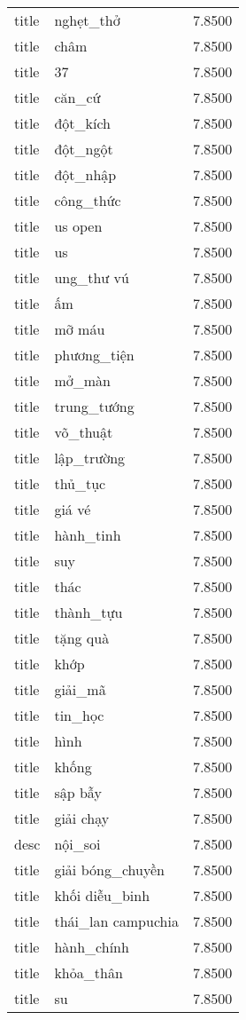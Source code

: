 \documentclass{article}
\begin{document}
\begin{tabular}{lll}
title & nghẹt\_thở & 7.8500\\
title & châm & 7.8500\\
title & 37 & 7.8500\\
title & căn\_cứ & 7.8500\\
title & đột\_kích & 7.8500\\
title & đột\_ngột & 7.8500\\
title & đột\_nhập & 7.8500\\
title & công\_thức & 7.8500\\
title & us open & 7.8500\\
title & us & 7.8500\\
title & ung\_thư vú & 7.8500\\
title & ấm & 7.8500\\
title & mỡ máu & 7.8500\\
title & phương\_tiện & 7.8500\\
title & mở\_màn & 7.8500\\
title & trung\_tướng & 7.8500\\
title & võ\_thuật & 7.8500\\
title & lập\_trường & 7.8500\\
title & thủ\_tục & 7.8500\\
title & giá vé & 7.8500\\
title & hành\_tinh & 7.8500\\
title & suy & 7.8500\\
title & thác & 7.8500\\
title & thành\_tựu & 7.8500\\
title & tặng quà & 7.8500\\
title & khớp & 7.8500\\
title & giải\_mã & 7.8500\\
title & tin\_học & 7.8500\\
title & hình & 7.8500\\
title & khống & 7.8500\\
title & sập bẫy & 7.8500\\
title & giải chạy & 7.8500\\
desc & nội\_soi & 7.8500\\
title & giải bóng\_chuyền & 7.8500\\
title & khối diễu\_binh & 7.8500\\
title & thái\_lan campuchia & 7.8500\\
title & hành\_chính & 7.8500\\
title & khỏa\_thân & 7.8500\\
title & su & 7.8500\\

\end{tabular}
\end{document}

